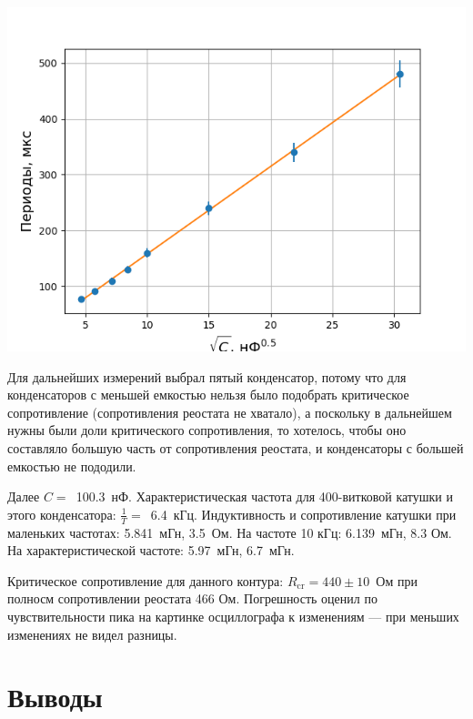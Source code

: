 \documentclass[a4paper, 12pt]{article}
\begin{document}
\begin{center}
\includegraphics[width=0.5\linewidth]{check_periods.png}
\end{center}

Для дальнейших измерений выбрал пятый конденсатор, потому что для конденсаторов с меньшей емкостью нельзя было подобрать критическое сопротивление (сопротивления реостата не хватало), а поскольку в дальнейшем нужны были доли критического сопротивления, то хотелось, чтобы оно составляло большую часть от сопротивления реостата, и конденсаторы с большей емкостью не пододили.

Далее $C =$~100.3~нФ.
Характеристическая частота для 400-витковой катушки и этого конденсатора: $\frac{1}{T} =$~6.4~кГц.
Индуктивность и сопротивление катушки при маленьких частотах: 5.841~мГн, 3.5~Ом.
На частоте 10 кГц: 6.139~мГн, 8.3 Ом.
На характеристической частоте: 5.97~мГн, 6.7~мГн.

Критическое сопротивление для данного контура: $R_{\text{cr}} = 440 \pm 10$~Ом при полносм сопротивлении реостата 466 Ом.
Погрешность оценил по чувствительности пика на картинке осциллографа к изменениям --- при меньших изменениях не видел разницы.

\section{Выводы}
\end{document}
